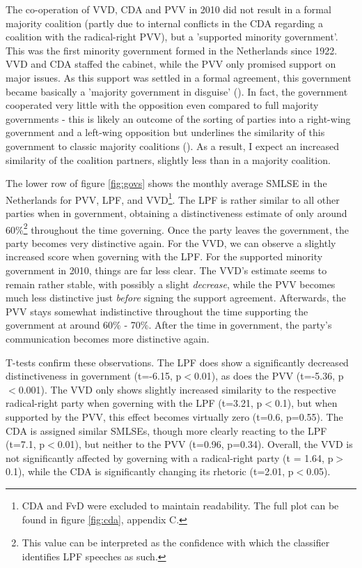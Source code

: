 \documentclass{article}
\begin{document}
The co-operation of VVD, CDA and PVV in 2010 did not result in a formal majority coalition (partly due to internal conflicts in the CDA regarding a coalition with the radical-right PVV), but a 'supported minority government'. This was the first minority government formed in the Netherlands since 1922. VVD and CDA staffed the cabinet, while the PVV only promised support on major issues. As this support was settled in a formal agreement, this government became basically a 'majority government in disguise' (\cite{Strom1990, VanHolsteyn2011}). In fact, the government cooperated very little with the opposition even compared to full majority governments - this is likely an outcome of the sorting of parties into a right-wing government and a left-wing opposition but underlines the similarity of this government to classic majority coalitions (\cite{Otjes2014}). As a result, I expect an increased similarity of the coalition partners, slightly less than in a majority coalition. \par

The lower row of figure \ref{fig:govs} shows the monthly average SMLSE in the Netherlands for PVV, LPF, and VVD\footnote{CDA and FvD were excluded to maintain readability. The full plot can be found in figure \ref{fig:cda}, appendix C.}. The LPF is rather similar to all other parties when in government, obtaining a distinctiveness estimate of only around 60\%\footnote{This value can be interpreted as the confidence with which the classifier identifies LPF speeches as such.} throughout the time governing. Once the party leaves the government, the party becomes very distinctive again. For the VVD, we can observe a slightly increased score when governing with the LPF. For the supported minority government in 2010, things are far less clear. The VVD's estimate seems to remain rather stable, with possibly a slight \textit{decrease}, while the PVV becomes much less distinctive just \textit{before} signing the support agreement. Afterwards, the PVV stays somewhat indistinctive throughout the time supporting the government at around 60\% - 70\%. After the time in government, the party's communication becomes more distinctive again.\par

T-tests confirm these observations. The LPF does show a significantly decreased distinctiveness in government (t=-6.15, p$<$0.01), as does the PVV (t=-5.36, p$<$0.001). The VVD only shows slightly increased similarity to the respective radical-right party when governing with the LPF (t=3.21, p$<$0.1), but when supported by the PVV, this effect becomes virtually zero (t=0.6, p=0.55). The CDA is assigned similar SMLSEs, though more clearly reacting to the LPF (t=7.1, p$<$0.01), but neither to the PVV (t=0.96, p=0.34). Overall, the VVD is not significantly affected by governing with a radical-right party (t = 1.64, p$>$0.1), while the CDA is significantly changing its rhetoric (t=2.01, p$<$0.05).\par
\end{document}
